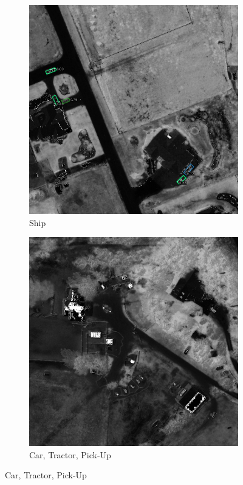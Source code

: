 \begin{figure}[h!]
    \begin{subfigure}[t]{0.38\textwidth}
        \centering
        \includegraphics[width=\linewidth]{images/015Results/03ablation/comp_images/ndvi/509.png}
        \caption{Ship}
    \end{subfigure}
    \begin{subfigure}[t]{0.38\textwidth}
        \centering
        \includegraphics[width=\linewidth]{images/015Results/03ablation/comp_images/ndvi/523.png}
        \caption{Car, Tractor, Pick-Up}
    \end{subfigure}
    

\end{figure}
